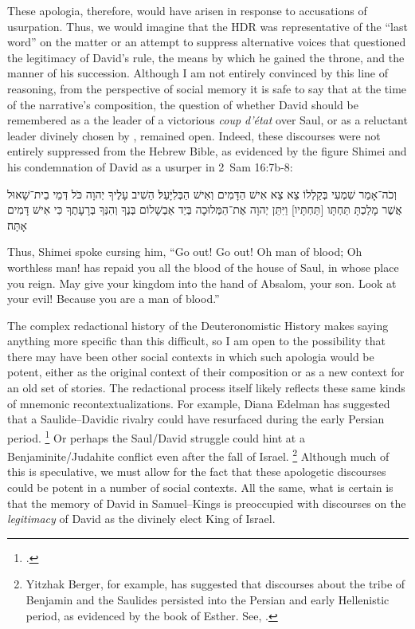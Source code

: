 These apologia, therefore, would have arisen in response to accusations of usurpation. Thus, we would imagine that the HDR was representative of the ``last word'' on the matter or an attempt to suppress alternative voices that questioned the legitimacy of David's rule, the means by which he gained the throne, and the manner of his succession. Although I am not entirely convinced by this line of reasoning, from the perspective of social memory it is safe to say that at the time of the narrative's composition, the question of whether David should be remembered as a the leader of a victorious \emph{coup d'état} over Saul, or as a reluctant leader divinely chosen by \yahweh, remained open. Indeed, these discourses were not entirely suppressed from the Hebrew Bible, as evidenced by the figure Shimei and his condemnation of David as a usurper in 2~Sam 16:7b-8:
\begin{hebrewtext}
    וְכֹה־אָמַר שִׁמְעִי בְּקַלְלוֹ צֵא צֵא אִישׁ הַדָּמִים וְאִישׁ הַבְּלִיָּעַל׃ 
    הֵשִׁיב עָלֶיךָ יְהוָה כֹּל דְּמֵי בֵית־שָׁאוּל אֲשֶׁר מָלַכְתָּ תַּחְתָּו [תַּחְתָּיו] וַיִּתֵּן יְהוָה אֶת־הַמְּלוּכָה בְּיַד אַבְשָׁלוֹם בְּנֶךָ וְהִנְּךָ בְּרָעָתֶךָ כִּי אִישׁ דָּמִים אָתָּה׃
\end{hebrewtext}
\begin{translation}
    Thus, Shimei spoke cursing him, ``Go out! Go out! Oh man of blood; Oh worthless man! \yahweh has repaid you all the blood of the house of Saul, in whose place you reign. May \yahweh give your kingdom into the hand of Absalom, your son. Look at your evil! Because you are a man of blood.''
\end{translation}
\noindent
The complex redactional history of the Deuteronomistic History makes saying anything more specific than this difficult, so I am open to the possibility that there may have been other social contexts in which such apologia would be potent, either as the original context of their composition or as a new context for an old set of stories. The redactional process itself likely reflects these same kinds of mnemonic recontextualizations. For example, Diana Edelman has suggested that a Saulide--Davidic rivalry could have resurfaced during the early Persian period.%
    \footnote{\Cite{edelman_dearman-graham2002}.}
Or perhaps the Saul/David struggle could hint at a Benjaminite/Judahite conflict even after the fall of Israel.%
    \footnote{Yitzhak Berger, for example, has suggested that discourses about the tribe of Benjamin and the Saulides persisted into the Persian and early Hellenistic period, as evidenced by the book of Esther. See, \cite{berger_jbl2010}.}
Although much of this is speculative, we must allow for the fact that these apologetic discourses could be potent in a number of social contexts. All the same, what is certain is that the memory of David in Samuel--Kings is preoccupied with discourses on the \emph{legitimacy} of David as the divinely elect King of Israel. 


